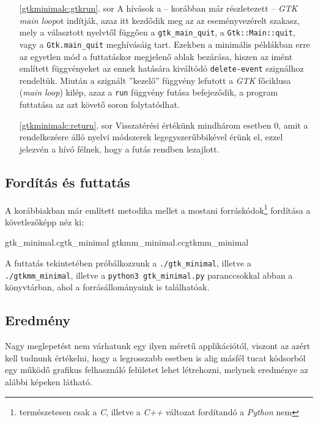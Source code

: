 \begin{enumerate}
 \item[\ref{gtkminimalc:gtkrun}. sor] A hívások a -- korábban már részletezett -- \textit{GTK main loop}ot indítják, azaz itt kezdődik meg az az eseményvezérelt szakasz, mely a választott nyelvtől függően a \texttt{gtk\_main\_quit}, a \texttt{Gtk::Main::quit}, vagy a \texttt{Gtk.main\_quit} meghívásáig tart. Ezekben a minimális példákban erre az egyetlen mód a futtatáskor megjelenő ablak bezárása, hiszen az imént említett függvényeket az ennek hatására kiváltódó \texttt{delete-event} szignálhoz rendeltük.  Miután a szignált ''kezelő'' függvény lefutott a \textit{GTK} főciklusa (\textit{main loop}) kilép, azaz a \texttt{run} függvény futása befejeződik, a program futtatása az azt követő soron folytatódhat.

 \item[\ref{gtkminimalc:return}. sor] Visszatérési értékünk mindhárom esetben 0, amit a rendelkezésre álló nyelvi módszerek legegyszerűbbikével érünk el, ezzel jelezvén a hívó félnek, hogy a futás rendben lezajlott.
\end{enumerate}

\subsection{Fordítás és futtatás}

A korábbiakban már említett metodika mellet a mostani forráskódok\footnote{természetesen csak a \textit{C}, illetve a \textit{C++} változat fordítandó a \textit{Python} nem} fordítása a követlezőképp néz ki:

\lstcompiles
{gtk_minimal.c}{gtk_minimal}
{gtkmm_minimal.cc}{gtkmm_minimal}

A futtatás tekintetében próbálkozzunk a \texttt{./gtk\_minimal}, illetve a \texttt{./gtkmm\_minimal}, illetve a \texttt{python3 gtk\_minimal.py} paranccsokkal abban a könyvtárban, ahol a forrásállományaink is találhatóak.

\subsection{Eredmény}

Nagy meglepetést nem várhatunk egy ilyen méretű applikációtól, viszont az azért kell tudnunk értékelni, hogy a legrosszabb esetben is alig másfél tucat kódsorból egy működő grafikus felhasználó felületet lehet létrehozni, melynek eredménye az alábbi képeken látható.


